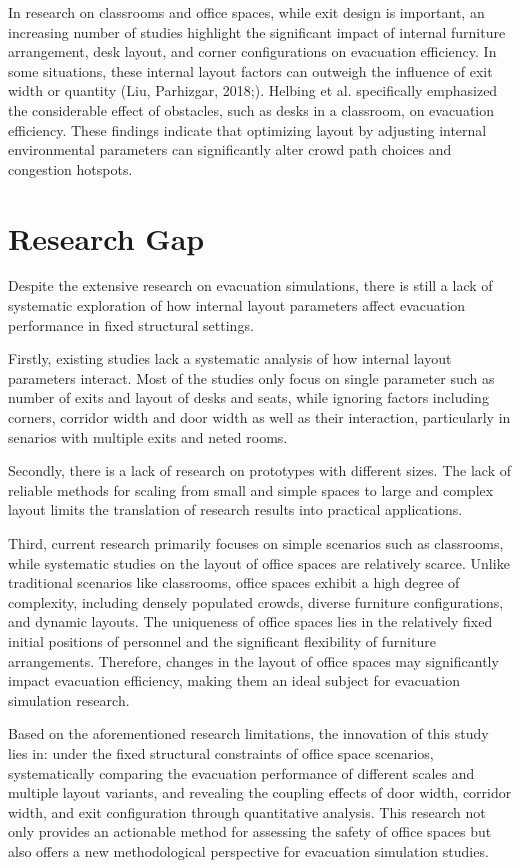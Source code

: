 In research on classrooms and office spaces, while exit design is important, an increasing number of studies highlight the significant impact of internal furniture arrangement, desk layout, and corner configurations on evacuation efficiency. In some situations, these internal layout factors can outweigh the influence of exit width or quantity (Liu, Parhizgar, 2018;). Helbing et al. specifically emphasized the considerable effect of obstacles, such as desks in a classroom, on evacuation efficiency. These findings indicate that optimizing layout by adjusting internal environmental parameters can significantly alter crowd path choices and congestion hotspots.

\section{Research Gap}
Despite the extensive research on evacuation simulations, there is still a lack of systematic exploration of how internal layout parameters affect evacuation performance in fixed structural settings. 

Firstly, existing studies lack a systematic analysis of how internal layout parameters interact. Most of the studies only focus on single parameter such as number of exits and layout of desks and seats, while ignoring factors including corners, corridor width and door width as well as their interaction, particularly in senarios with multiple exits and neted rooms.

Secondly, there is a lack of research on prototypes with different sizes. The lack of reliable methods for scaling from small and simple spaces to large and complex layout limits the translation of research results into practical applications.

Third, current research primarily focuses on simple scenarios such as classrooms, while systematic studies on the layout of office spaces are relatively scarce. Unlike traditional scenarios like classrooms, office spaces exhibit a high degree of complexity, including densely populated crowds, diverse furniture configurations, and dynamic layouts. The uniqueness of office spaces lies in the relatively fixed initial positions of personnel and the significant flexibility of furniture arrangements. Therefore, changes in the layout of office spaces may significantly impact evacuation efficiency, making them an ideal subject for evacuation simulation research.

Based on the aforementioned research limitations, the innovation of this study lies in: under the fixed structural constraints of office space scenarios, systematically comparing the evacuation performance of different scales and multiple layout variants, and revealing the coupling effects of door width, corridor width, and exit configuration through quantitative analysis. This research not only provides an actionable method for assessing the safety of office spaces but also offers a new methodological perspective for evacuation simulation studies.
